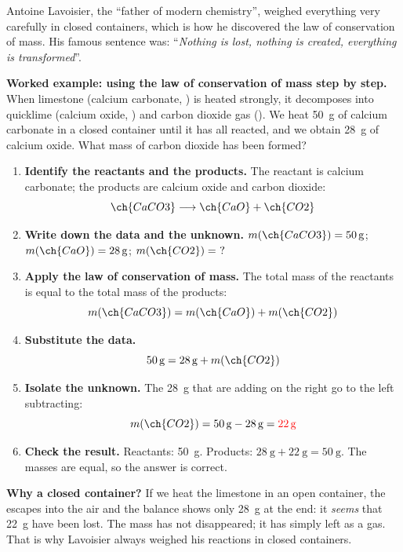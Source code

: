 \begin{didyouknow}
    Antoine Lavoisier, the ``father of modern chemistry'', weighed everything very carefully in closed containers, which is how he discovered the law of conservation of mass. His famous sentence was: ``\emph{Nothing is lost, nothing is created, everything is transformed}''.
\end{didyouknow}

\begin{example}
    \textbf{Worked example: using the law of conservation of mass step by step.} When limestone (calcium carbonate, ) is heated strongly, it decomposes into quicklime (calcium oxide, ) and carbon dioxide gas (). We heat \qty{50}{\g} of calcium carbonate in a closed container until it has all reacted, and we obtain \qty{28}{\g} of calcium oxide. What mass of carbon dioxide has been formed?
    \begin{enumerate}[label=\numberballmDarkTeal]
        \item \textbf{Identify the reactants and the products.} The reactant is calcium carbonate; the products are calcium oxide and carbon dioxide:
        \[
            \ch{CaCO3} \longrightarrow \ch{CaO} + \ch{CO2}
        \]
        \item \textbf{Write down the data and the unknown.} \(m(\ch{CaCO3}) = \qty{50}{\g}\); \quad \(m(\ch{CaO}) = \qty{28}{\g}\); \quad \(m(\ch{CO2}) = \ ?\)
        \item \textbf{Apply the law of conservation of mass.} The total mass of the reactants is equal to the total mass of the products:
        \[
            m(\ch{CaCO3}) = m(\ch{CaO}) + m(\ch{CO2})
        \]
        \item \textbf{Substitute the data.}
        \[
            \qty{50}{\g} = \qty{28}{\g} + m(\ch{CO2})
        \]
        \item \textbf{Isolate the unknown.} The \qty{28}{\g} that are adding on the right go to the left subtracting:
        \[
            m(\ch{CO2}) = \qty{50}{\g} - \qty{28}{\g} = \textcolor{red}{\qty{22}{\g}}
        \]
        \item \textbf{Check the result.} Reactants: \qty{50}{\g}. Products: \(\qty{28}{\g} + \qty{22}{\g} = \qty{50}{\g}\). The masses are equal, so the answer is correct.
    \end{enumerate}
    \textbf{Why a closed container?} If we heat the limestone in an open container, the  escapes into the air and the balance shows only \qty{28}{\g} at the end: it \emph{seems} that \qty{22}{\g} have been lost. The mass has not disappeared; it has simply left as a gas. That is why Lavoisier always weighed his reactions in closed containers.
\end{example}

